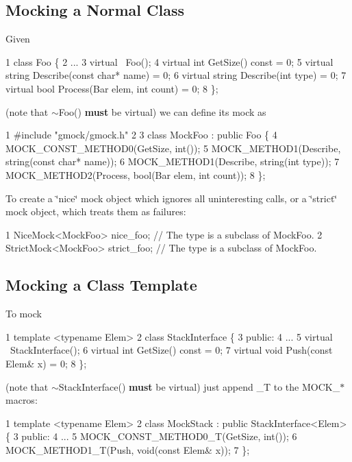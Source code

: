 \subsection*{Mocking a Normal Class}

Given 
\begin{DoxyCode}
1 class Foo \{
2   ...
3   virtual ~Foo();
4   virtual int GetSize() const = 0;
5   virtual string Describe(const char* name) = 0;
6   virtual string Describe(int type) = 0;
7   virtual bool Process(Bar elem, int count) = 0;
8 \};
\end{DoxyCode}
 (note that {\ttfamily $\sim$\+Foo()} {\bfseries must} be virtual) we can define its mock as 
\begin{DoxyCode}
1 #include "gmock/gmock.h"
2 
3 class MockFoo : public Foo \{
4   MOCK\_CONST\_METHOD0(GetSize, int());
5   MOCK\_METHOD1(Describe, string(const char* name));
6   MOCK\_METHOD1(Describe, string(int type));
7   MOCK\_METHOD2(Process, bool(Bar elem, int count));
8 \};
\end{DoxyCode}


To create a \char`\"{}nice\char`\"{} mock object which ignores all uninteresting calls, or a \char`\"{}strict\char`\"{} mock object, which treats them as failures\+: 
\begin{DoxyCode}
1 NiceMock<MockFoo> nice\_foo;     // The type is a subclass of MockFoo.
2 StrictMock<MockFoo> strict\_foo; // The type is a subclass of MockFoo.
\end{DoxyCode}


\subsection*{Mocking a Class Template}

To mock 
\begin{DoxyCode}
1 template <typename Elem>
2 class StackInterface \{
3  public:
4   ...
5   virtual ~StackInterface();
6   virtual int GetSize() const = 0;
7   virtual void Push(const Elem& x) = 0;
8 \};
\end{DoxyCode}
 (note that {\ttfamily $\sim$\+Stack\+Interface()} {\bfseries must} be virtual) just append {\ttfamily \+\_\+T} to the {\ttfamily M\+O\+C\+K\+\_\+$\ast$} macros\+: 
\begin{DoxyCode}
1 template <typename Elem>
2 class MockStack : public StackInterface<Elem> \{
3  public:
4   ...
5   MOCK\_CONST\_METHOD0\_T(GetSize, int());
6   MOCK\_METHOD1\_T(Push, void(const Elem& x));
7 \};
\end{DoxyCode}


